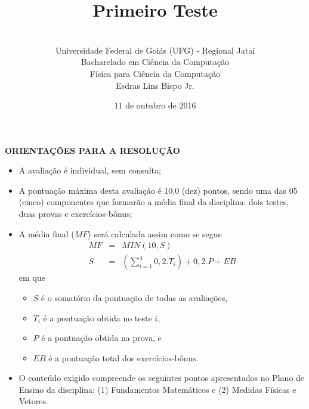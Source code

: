 \documentclass[12pt,a4paper,oneside]{article}
\author{\\Universidade Federal de Goiás (UFG) - Regional Jataí\\Bacharelado em Ciência da Computação \\Física para Ciência da Computação \\Esdras Lins Bispo Jr.}
\title{\sc \huge Primeiro Teste}
\date{11 de outubro de 2016}
\begin{document}
\maketitle

{\bf ORIENTAÇÕES PARA A RESOLUÇÃO}

\footnotesize

\begin{itemize}
	\item A avaliação é individual, sem consulta;
	\item A pontuação máxima desta avaliação é 10,0 (dez) pontos, sendo uma das 05 (cinco) componentes que formarão a média final da disciplina: dois testes, duas provas e exercícios-bônus;
	\item A média final ($MF$) será calculada assim como se segue
	\begin{eqnarray}
		MF & = & MIN(10, S) \nonumber \\
		S & = & (\sum_{i=1}^{4} 0,2.T_i ) + 0,2.P  + EB \nonumber
	\end{eqnarray}
	em que 
	\begin{itemize}
		\item $S$ é o somatório da pontuação de todas as avaliações,
		\item $T_i$ é a pontuação obtida no teste $i$,
		\item $P$ é a pontuação obtida na prova, e
		\item $EB$ é a pontuação total dos exercícios-bônus.
	\end{itemize}
	\item O conteúdo exigido compreende os seguintes pontos apresentados no Plano de Ensino da disciplina: (1) Fundamentos Matemáticos e (2) Medidas Físicas e Vetores.
\end{itemize}


\begin{center}
\end{center}

\newpage

\normalsize
\end{document}
